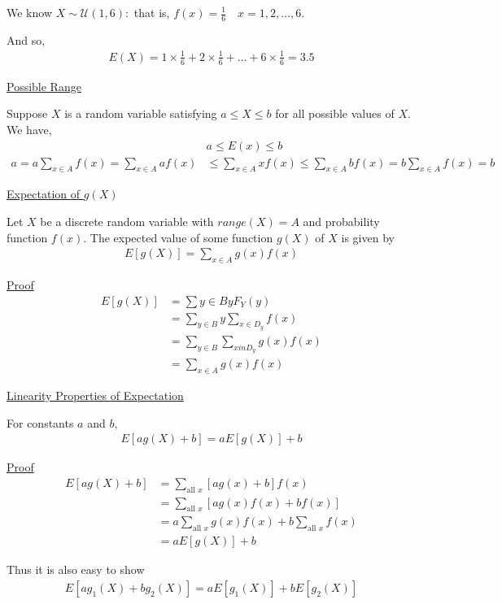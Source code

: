 \documentclass{article}
\begin{document}
We know $X \sim \mathcal{U}(1,6):$ that is, $f(x) = \frac{1}{6} \quad x=1,2,\ldots,6$.

And so,
\begin{align*}
    E(X) = 1 \times \frac{1}{6} + 2 \times \frac{1}{6} + \ldots + 6 \times \frac{1}{6} = 3.5
\end{align*}

\underline{Possible Range}

Suppose $X$ is a random variable satisfying $a \le X \le b$ for all possible values of $X$. We have,
\begin{align*}
    &a \le E(x) \le b
    \\
    a = a\sum_{x \in A}f(x) = \sum_{x \in A}af(x) &\le \sum_{x \in A}xf(x) \le \sum_{x \in A}bf(x) = b\sum_{x \in A}f(x) = b
\end{align*}

\underline{Expectation of $g(X)$}

Let $X$ be a discrete random variable with $range(X) = A$ and probability function $f(x)$. The expected value of some function $g(X)$ of $X$ is given by
\begin{align*}
    E[g(X)] = \sum_{x \in A}g(x)f(x)
\end{align*}

\underline{Proof}
\begin{align*}
    E[g(X)] &= \sum{y \in B}yF_Y(y)\\
    &= \sum_{y \in B}y\sum_{x \in D_y}f(x)\\
    &= \sum_{y \in B}\sum_{x in D_y}g(x)f(x)\\
    &= \sum_{x \in A}g(x)f(x)
\end{align*}

\underline{Linearity Properties of Expectation}

For constants $a$ and $b$,
\begin{align*}
    E[ag(X) + b] = aE[g(X)] + b
\end{align*}

\underline{Proof}
\begin{align*}
    E[ag(X) + b] &= \sum_{\text{all } x}[ag(x) + b]f(x) \\
    &= \sum_{\text{all }x}[ag(x)f(x) + bf(x)]\\
    &= a\sum_{\text{all }x}g(x)f(x) + b \sum_{\text{all }x}f(x) \\
    &= aE[g(X)] + b 
\end{align*}

Thus it is also easy to show
\begin{align*}
    E[ag_1(X) + bg_2(X)] = aE[g_1(X)] + bE[g_2(X)]
\end{align*}
\end{document}
